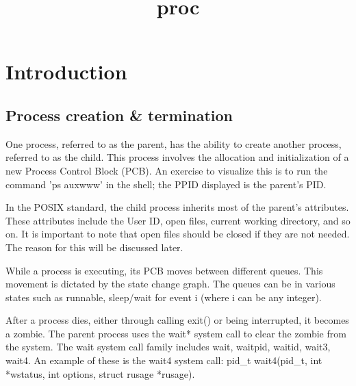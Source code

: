 \documentclass[12pt]{report}
\title{proc}
\author{}
\begin{document}
\maketitle
\tableofcontents
\newpage

\section{Introduction}
\subsection*{Process creation \& termination}

One process, referred to as the parent, has the ability to create another process, referred to as the child. This process involves the allocation and initialization of a new Process Control Block (PCB). An exercise to visualize this is to run the command 'ps auxwww' in the shell; the PPID displayed is the parent's PID.

In the POSIX standard, the child process inherits most of the parent's attributes. These attributes include the User ID, open files, current working directory, and so on. It is important to note that open files should be closed if they are not needed. The reason for this will be discussed later.

While a process is executing, its PCB moves between different queues. This movement is dictated by the state change graph. The queues can be in various states such as runnable, sleep/wait for event i (where i can be any integer).

After a process dies, either through calling exit() or being interrupted, it becomes a zombie. The parent process uses the wait* system call to clear the zombie from the system. The wait system call family includes wait, waitpid, waitid, wait3, wait4. An example of these is the wait4 system call: pid_t wait4(pid_t, int *wstatus, int options, struct rusage *rusage).
\end{document}
